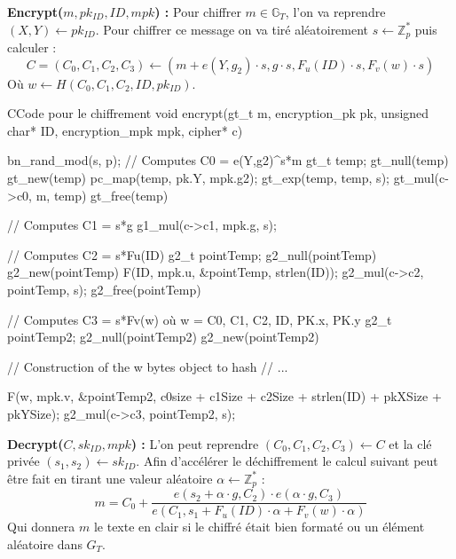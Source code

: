 \textbf{Encrypt($m, pk_{ID}, ID, mpk$) :} Pour chiffrer $m \in \mathbb{G}_T$, l'on va reprendre $(X,Y) \leftarrow pk_{ID}$. Pour chiffrer ce message on va tiré aléatoirement $s \leftarrow \mathbb{Z}_p^*$ puis calculer : 
\[C = (C_0, C_1, C_2, C_3) \leftarrow (m + e(Y, g_2) \cdot s, g \cdot s,F_u(ID) \cdot s, F_v(w) \cdot s )\]
Où $w \leftarrow H(C_0,C_1, C_2, ID, pk_{ID})$.

\begin{sourcebox}{C}{Code pour le chiffrement}
	void encrypt(gt_t m, encryption_pk pk, unsigned char* ID, encryption_mpk mpk, cipher* c){
		bn_rand_mod(s, p);
		// Computes C0 = e(Y,g2)^s*m
		gt_t temp;
		gt_null(temp)
		gt_new(temp)
		pc_map(temp, pk.Y, mpk.g2);
		gt_exp(temp, temp, s);
		gt_mul(c->c0, m, temp)
		gt_free(temp)
		
		// Computes C1 = s*g
		g1_mul(c->c1, mpk.g, s);
		
		// Computes C2 = s*Fu(ID)
		g2_t pointTemp;
		g2_null(pointTemp)
		g2_new(pointTemp)
		F(ID, mpk.u, &pointTemp, strlen(ID));
		g2_mul(c->c2, pointTemp, s);
		g2_free(pointTemp)
		
		// Computes C3 = s*Fv(w) où w = C0, C1, C2, ID, PK.x, PK.y
		g2_t pointTemp2;
		g2_null(pointTemp2)
		g2_new(pointTemp2)
		
		// Construction of the w bytes object to hash
		// ...
		
		F(w, mpk.v, &pointTemp2, c0size + c1Size + c2Size + strlen(ID) + pkXSize + pkYSize);
		g2_mul(c->c3, pointTemp2, s);
	}
\end{sourcebox}

\textbf{Decrypt($C, sk_{ID}, mpk$) :} L'on peut reprendre $(C_0,C_1,C_2,C_3) \leftarrow C$ et la clé privée $(s_1, s_2) \leftarrow sk_{ID}$. Afin d'accélérer le déchiffrement le calcul suivant peut être fait en tirant une valeur aléatoire $\alpha \leftarrow \mathbb{Z}_p^*$ :
\[m = C_0 + \frac{e(s_2 + \alpha \cdot g, C_2 ) \cdot e(\alpha \cdot g, C_3)}{e(C_1, s_1 + F_u(ID) \cdot \alpha + F_v(w) \cdot \alpha)}\]
Qui donnera $m$ le texte en clair si le chiffré était bien formaté ou un élément aléatoire dans $G_T$.

